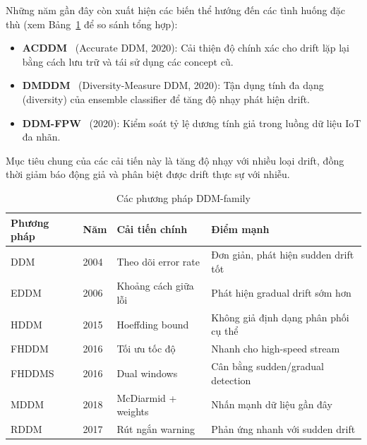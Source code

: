 Những năm gần đây còn xuất hiện các biến thể hướng đến các tình huống đặc thù (xem Bảng~\ref{tab:ddm_comparison} để so sánh tổng hợp):
\begin{itemize}
	\item \textbf{ACDDM}~\cite{yan2020acddm} (Accurate DDM, 2020): Cải thiện độ chính xác cho drift lặp lại bằng cách lưu trữ và tái sử dụng các concept cũ.
	\item \textbf{DMDDM}~\cite{mahdi2020dmddm} (Diversity-Measure DDM, 2020): Tận dụng tính đa dạng (diversity) của ensemble classifier để tăng độ nhạy phát hiện drift.
	\item \textbf{DDM-FPW}~\cite{wang2020ddmfpw} (2020): Kiểm soát tỷ lệ dương tính giả trong luồng dữ liệu IoT đa nhãn.
\end{itemize}
Mục tiêu chung của các cải tiến này là tăng độ nhạy với nhiều loại drift, đồng thời giảm báo động giả và phân biệt được drift thực sự với nhiễu.

\begin{table}[H]
	\centering
	\caption{Các phương pháp DDM-family}
	\label{tab:ddm_comparison}
	\begin{tabular}{@{}llll@{}}
		\toprule
		\textbf{Phương pháp}                   & \textbf{Năm} & \textbf{Cải tiến chính} & \textbf{Điểm mạnh}                    \\
		\midrule
		DDM~\cite{gama2004learning}            & 2004         & Theo dõi error rate     & Đơn giản, phát hiện sudden drift tốt  \\
		EDDM~\cite{baena2006early}             & 2006         & Khoảng cách giữa lỗi    & Phát hiện gradual drift sớm hơn       \\
		HDDM~\cite{friasblanco2015hddm}        & 2015         & Hoeffding bound         & Không giả định dạng phân phối cụ thể \\
		FHDDM~\cite{pesaranghader2016fhddm}    & 2016         & Tối ưu tốc độ           & Nhanh cho high-speed stream           \\
		FHDDMS~\cite{pesaranghader2016fhddm}   & 2016         & Dual windows            & Cân bằng sudden/gradual detection     \\
		MDDM~\cite{pesaranghader2018mcdiarmid} & 2018         & McDiarmid + weights     & Nhấn mạnh dữ liệu gần đây             \\
		RDDM~\cite{barros2017rddm}             & 2017         & Rút ngắn warning        & Phản ứng nhanh với sudden drift       \\
		\bottomrule
	\end{tabular}
\end{table}

